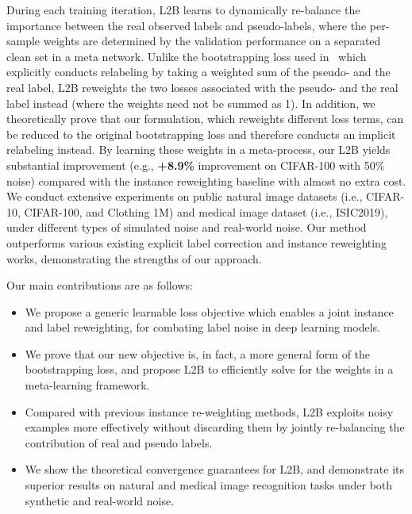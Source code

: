 \documentclass{article}
\begin{document}
During each training iteration, L2B learns to dynamically re-balance the importance between the real observed labels and pseudo-labels, where the per-sample weights are determined by the validation performance on a separated clean set in a meta network.
Unlike the bootstrapping loss used in~\cite{reed2014training,arazo2019unsupervised,zhang2020distilling} which explicitly conducts relabeling by taking a weighted sum of the pseudo- and the real label, L2B reweights the two losses associated with the pseudo- and the real label instead (where the weights need not be summed as 1). 
In addition, we theoretically prove that our formulation, which reweights different loss terms, can be reduced to the original bootstrapping loss and therefore conducts an implicit relabeling instead. 
By learning these weights in a meta-process, our L2B yields substantial improvement (e.g., \textbf{+8.9\%} improvement on CIFAR-100 with 50\% noise) compared with the instance reweighting baseline with almost no extra cost.
We conduct extensive experiments on public natural image datasets (i.e., CIFAR-10, CIFAR-100, and Clothing 1M) and medical image dataset (i.e., ISIC2019), under different types of simulated noise and real-world noise. Our method outperforms various existing explicit label correction and instance reweighting works, demonstrating the strengths of our approach.

Our main contributions are as follows:
\begin{itemize}
    \item We propose a generic learnable loss objective which enables a joint instance and label reweighting, for combating label noise in deep learning models. 
    
    \item We prove that our new objective is, in fact, a more general form of the bootstrapping loss, and propose L2B to efficiently solve for the weights in a meta-learning framework.
    
    \item  Compared with previous instance re-weighting methods, L2B exploits noisy examples more effectively without discarding them by jointly re-balancing the contribution of real and pseudo labels.
    
    \item We show the theoretical convergence guarantees for L2B, and demonstrate its superior results on natural and medical image recognition tasks under both synthetic and real-world noise.
\end{itemize}
\end{document}
